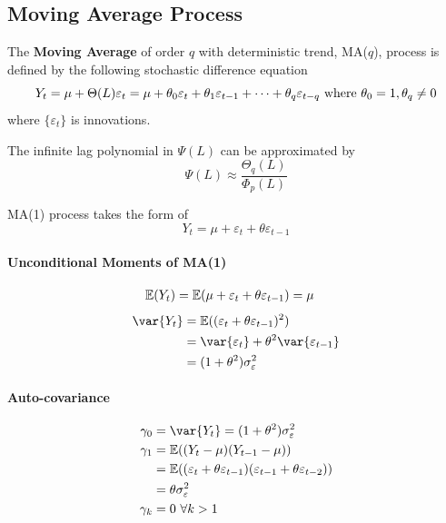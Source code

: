 \documentclass[11pt]{article}
\begin{document}
		\subsection{Moving Average Process}
			\begin{definition}
				The \textbf{Moving Average} of order $q$ with deterministic trend, MA($q$), process is defined by the following stochastic difference equation
				\begin{equation}
					Y_t = \mu + \Theta(L) \varepsilon_t = \mu + \theta_0 \varepsilon_t + \theta_1 \varepsilon_{t-1} + \dots + \theta_q \varepsilon_{t-q} \text{{ where }} \theta_0 = 1, \theta_q \neq 0
				\end{equation}
				where $\{\varepsilon_t\}$ is innovations.
			\end{definition}
			
			\begin{lemma}
				The infinite lag polynomial in $\Psi(L)$ can be approximated by
				\begin{equation}
					\Psi(L) \approx \frac{\Theta_q(L)}{\Phi_p(L)}
				\end{equation}
			\end{lemma}
			
			\begin{definition}
				MA(1) process takes the form of 
				\begin{equation}
					Y_t = \mu + \varepsilon_t + \theta \varepsilon_{t-1}
				\end{equation}
			\end{definition}
			
			\paragraph{Unconditional Moments of MA(1)}
				\begin{align}
					\mathbb{E}({Y_t}) = \mathbb{E}({\mu + \varepsilon_t + \theta \varepsilon_{t-1}}) &= \mu 
				\end{align}
				\begin{align}
					\var{Y_t} &= \expect{(\varepsilon_t + \theta \varepsilon_{t-1})^2} \\
					&= \var{\varepsilon_t} + \theta^2 \var{\varepsilon_{t-1}} \\
					&= (1 + \theta^2) \sigma_\varepsilon^2
				\end{align}
			\paragraph{Auto-covariance}
				\begin{align}
					\gamma_0 &= \var{Y_t} = (1 + \theta^2) \sigma_\varepsilon^2\\
					\gamma_1 &= \expect{(Y_t - \mu) (Y_{t-1} - \mu)} \\
					&= \expect{(\varepsilon_t + \theta \varepsilon_{t-1})(\varepsilon_{t-1} + \theta \varepsilon_{t-2})} \\
					&= \theta \sigma_\varepsilon^2 \\
					\gamma_k &= 0\ \forall k > 1
				\end{align}
\end{document}
